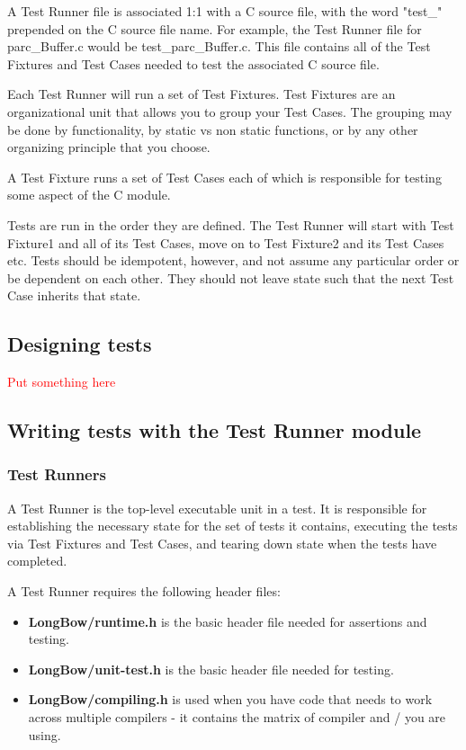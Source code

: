 \documentclass[12pt]{article} %
\begin{document}
A Test Runner file is associated 1:1 with a C source file, with the word "test\_" prepended on the C source file name.  For example, the Test Runner file for parc\_Buffer.c would be test\_parc\_Buffer.c. This file contains all of the Test Fixtures and Test Cases needed to test the associated C source file.

 Each Test Runner will run a set of Test Fixtures.  Test Fixtures are an organizational unit that allows you to group your Test Cases.  The grouping may be done by functionality, by static vs non static functions, or by any other organizing principle that you choose. 
 
 A Test Fixture runs a set of Test Cases each of which is responsible for testing some aspect of the C module. 

Tests are run in the order they are defined.  The Test Runner will start with Test Fixture1 and all of its Test Cases, move on to Test Fixture2 and its Test Cases etc. Tests should be idempotent, however, and not assume any particular order or be dependent on each other. They should not leave state such that the next Test Case inherits that state. 

\subsection{Designing tests }  
\textcolor{red}{Put something here}

\subsection{Writing tests with the Test Runner module }  
\subsubsection{Test Runners}
A Test Runner is the top-level executable unit in a test. It is responsible for establishing the necessary state for the set of tests it contains, executing the tests via Test Fixtures and Test Cases, and tearing down state when the tests have completed. 

A Test Runner requires the  following header files:
\begin{itemize}
\item \textbf{LongBow/runtime.h} is the basic header file needed for assertions and testing.
\item \textbf{LongBow/unit-test.h} is the basic header file needed for testing.
\item \textbf{LongBow/compiling.h} is used when you have code that needs to work across multiple compilers - it contains the matrix of compiler and / you are using.
\end{itemize} 
\end{document}
